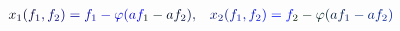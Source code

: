 \documentclass[12pt]{article}
\begin{document}
\makeatletter
\renewcommand*{\@textcolor}[3]{%
  \protect\leavevmode
  \begingroup
    \color#1{#2}#3%
  \endgroup
}
\makeatother
\begin{displaymath}
\begin{array} {rlr} \displaystyle & \displaystyle { { } \mathcolor[RGB]{0,0,15}{x} _ { \mathcolor[RGB]{0,0,30}{1} } \mathcolor[RGB]{0,0,45}{(} \mathcolor[RGB]{0,0,60}{f} _ { \mathcolor[RGB]{0,0,75}{1} } \mathcolor[RGB]{0,0,90}{,} \mathcolor[RGB]{0,0,105}{f} _ { \mathcolor[RGB]{0,0,120}{2} } \mathcolor[RGB]{0,0,135}{)} \mathcolor[RGB]{0,0,150}{=} \mathcolor[RGB]{0,0,165}{f} _ { \mathcolor[RGB]{0,0,180}{1} } \mathcolor[RGB]{0,0,195}{-} \mathcolor[RGB]{0,0,210}{\varphi} \mathcolor[RGB]{0,0,225}{(} \mathcolor[RGB]{0,0,240}{a} \mathcolor[RGB]{0,0,255}{f} _ { \mathcolor[RGB]{0,15,0}{1} } \mathcolor[RGB]{0,15,15}{-} \mathcolor[RGB]{0,15,30}{a} \mathcolor[RGB]{0,15,45}{f} _ { \mathcolor[RGB]{0,15,60}{2} } \mathcolor[RGB]{0,15,75}{)} \mathcolor[RGB]{0,15,90}{,} } & \displaystyle { \mathcolor[RGB]{0,15,105}{x} _ { \mathcolor[RGB]{0,15,120}{2} } \mathcolor[RGB]{0,15,135}{(} \mathcolor[RGB]{0,15,150}{f} _ { \mathcolor[RGB]{0,15,165}{1} } \mathcolor[RGB]{0,15,180}{,} \mathcolor[RGB]{0,15,195}{f} _ { \mathcolor[RGB]{0,15,210}{2} } \mathcolor[RGB]{0,15,225}{)} \mathcolor[RGB]{0,15,240}{=} \mathcolor[RGB]{0,15,255}{f} _ { \mathcolor[RGB]{0,30,0}{2} } \mathcolor[RGB]{0,30,15}{-} \mathcolor[RGB]{0,30,30}{\varphi} \mathcolor[RGB]{0,30,45}{(} \mathcolor[RGB]{0,30,60}{a} \mathcolor[RGB]{0,30,75}{f} _ { \mathcolor[RGB]{0,30,90}{1} } \mathcolor[RGB]{0,30,105}{-} \mathcolor[RGB]{0,30,120}{a} \mathcolor[RGB]{0,30,135}{f} _ { \mathcolor[RGB]{0,30,150}{2} } \mathcolor[RGB]{0,30,165}{)} } \end{array}
\end{displaymath}
\end{document}
